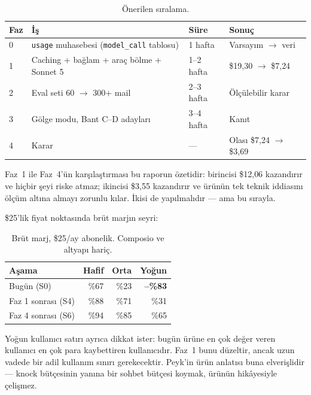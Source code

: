 \documentclass[11pt,a4paper]{article}
\newcommand{\code}[1]{\texttt{\small #1}}
\begin{document}
\begin{table}[h]
\centering\small
\renewcommand{\arraystretch}{1.3}
\begin{tabular}{@{}llll@{}}
\toprule
\textbf{Faz} & \textbf{İş} & \textbf{Süre} & \textbf{Sonuç} \\
\midrule
0 & \code{usage} muhasebesi (\code{model\_call} tablosu) & 1 hafta & Varsayım $\rightarrow$ veri \\
1 & Caching + bağlam + araç bölme + Sonnet 5 & 1--2 hafta & \$19{,}30 $\rightarrow$ \$7{,}24 \\
2 & Eval seti 60 $\rightarrow$ 300+ mail & 2--3 hafta & Ölçülebilir karar \\
3 & Gölge modu, Bant C--D adayları & 3--4 hafta & Kanıt \\
4 & Karar & --- & Olası \$7{,}24 $\rightarrow$ \$3{,}69 \\
\bottomrule
\end{tabular}
\caption{Önerilen sıralama.}
\end{table}

Faz~1 ile Faz~4'ün karşılaştırması bu raporun özetidir: birincisi \$12{,}06 kazandırır ve
hiçbir şeyi riske atmaz; ikincisi \$3{,}55 kazandırır ve ürünün tek teknik iddiasını
ölçüm altına almayı zorunlu kılar. İkisi de yapılmalıdır --- ama bu sırayla.

\$25'lik fiyat noktasında brüt marjın seyri:

\begin{table}[h]
\centering\small
\begin{tabular}{@{}lrrr@{}}
\toprule
\textbf{Aşama} & \textbf{Hafif} & \textbf{Orta} & \textbf{Yoğun} \\
\midrule
Bugün (S0) & \%67 & \%23 & \textbf{--\%83} \\
Faz 1 sonrası (S4) & \%88 & \%71 & \%31 \\
Faz 4 sonrası (S6) & \%94 & \%85 & \%65 \\
\bottomrule
\end{tabular}
\caption{Brüt marj, \$25/ay abonelik. Composio ve altyapı hariç.}
\end{table}

Yoğun kullanıcı satırı ayrıca dikkat ister: bugün ürüne en çok değer veren kullanıcı en
çok para kaybettiren kullanıcıdır. Faz~1 bunu düzeltir, ancak uzun vadede bir adil
kullanım sınırı gerekecektir. Peyk'in ürün anlatısı buna elverişlidir --- knock bütçesinin
yanına bir sohbet bütçesi koymak, ürünün hikâyesiyle çelişmez.

\appendix
\end{document}
